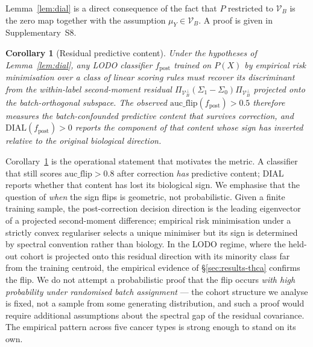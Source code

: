 \documentclass[11pt,a4paper]{article}
\newtheorem{corollary}{Corollary}
\begin{document}
Lemma~\ref{lem:dial} is a direct consequence of the fact that $P$
restricted to $\mathcal{V}_B$ is the zero map together with the
assumption $\mu_Y \in \mathcal{V}_B$. A proof is given in
Supplementary~S8.

\begin{corollary}[Residual predictive content]
\label{cor:dial}
Under the hypotheses of Lemma~\ref{lem:dial}, any LODO classifier
$f_{\mathrm{post}}$ trained on $P(X)$ by empirical risk minimisation
over a class of linear scoring rules must recover its discriminant
from the within-label second-moment residual
$\Pi_{\mathcal{V}_B^\perp}(\Sigma_1 - \Sigma_0)\Pi_{\mathcal{V}_B^\perp}$
projected onto the batch-orthogonal subspace. The observed
$\mathrm{auc\_flip}(f_{\mathrm{post}}) > 0.5$ therefore measures the
batch-confounded predictive content that survives correction, and
$\mathrm{DIAL}(f_{\mathrm{post}}) > 0$ reports the component of that
content whose \emph{sign} has inverted relative to the original
biological direction.
\end{corollary}

Corollary~\ref{cor:dial} is the operational statement that motivates
the metric. A classifier that still scores
$\mathrm{auc\_flip} > 0.8$ after correction \emph{has} predictive
content; DIAL reports whether that content has lost its biological
sign. We emphasise that the question of \emph{when} the sign flips is
geometric, not probabilistic. Given a finite training sample, the
post-correction decision direction is the leading eigenvector of a
projected second-moment difference; empirical risk minimisation under
a strictly convex regulariser selects a unique minimiser but its sign
is determined by spectral convention rather than biology. In the
LODO regime, where the held-out cohort is projected onto this
residual direction with its minority class far from the training
centroid, the empirical evidence of \S\ref{sec:results-thca} confirms
the flip. We do not attempt a probabilistic proof that the flip
occurs \emph{with high probability under randomised batch assignment}
--- the cohort structure we analyse is fixed, not a sample from some
generating distribution, and such a proof would require additional
assumptions about the spectral gap of the residual covariance. The
empirical pattern across five cancer types is strong enough to stand
on its own.
\end{document}
